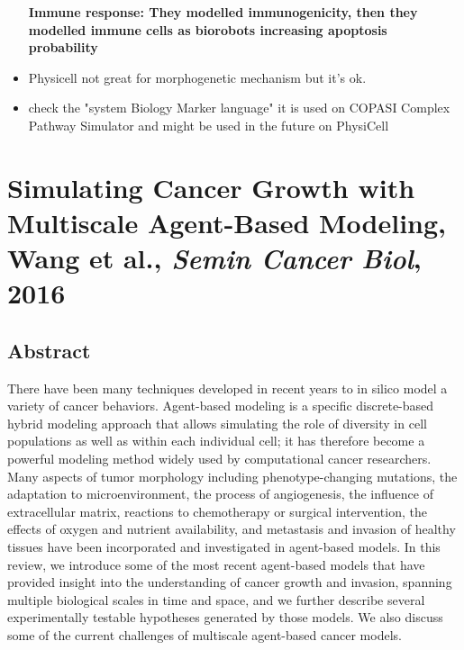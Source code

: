 \documentclass[11pt,a4paper]{article}
\begin{document}
\begin{itemize}
\textmu \textbf{Immune response: They modelled immunogenicity, then they modelled immune cells as biorobots increasing apoptosis probability}
\item Physicell not great for morphogenetic mechanism but it's ok.
\item check the "system Biology Marker language" it is used on COPASI Complex Pathway Simulator and might be used in the future on PhysiCell
\end{itemize}

\section*{Simulating Cancer Growth with Multiscale Agent-Based Modeling, Wang et al., \textit{Semin Cancer Biol}, 2016}
\subsection*{Abstract}
There have been many techniques developed in recent years to in silico model a variety of cancer behaviors. Agent-based modeling is a specific discrete-based hybrid modeling approach that allows simulating the role of diversity in cell populations as well as within each individual cell; it has therefore become a powerful modeling method widely used by computational cancer researchers. Many aspects of tumor morphology including phenotype-changing mutations, the adaptation to microenvironment, the process of angiogenesis, the influence of extracellular matrix, reactions to chemotherapy or surgical intervention, the effects of oxygen and nutrient availability, and metastasis and invasion of healthy tissues have been incorporated and investigated in agent-based models. In this review, we introduce some of the most recent agent-based models that have provided insight into the understanding of cancer growth and invasion, spanning multiple biological scales in time and space, and we further describe several experimentally testable hypotheses generated by those models. We also discuss some of the current challenges of multiscale agent-based cancer models.
\end{document}
